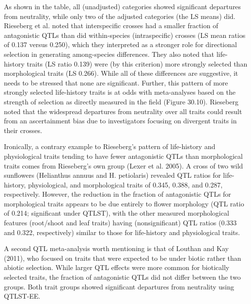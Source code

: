 \documentclass{article}
\begin{document}
As shown in the table, all (unadjusted) categories showed significant departures from neutrality, while only two of the adjusted categories (the LS means) did. Rieseberg et al. noted that interspecific crosses had a smaller fraction of antagonistic QTLs than did within-species (intraspecific) crosses (LS mean ratios of 0.137 versus 0.250), which they interpreted as a stronger role for directional selection in generating among-species differences. They also noted that life-history traits (LS ratio 0.139) were (by this criterion) more strongly selected than morphological traits (LS 0.266). While all of these differences are suggestive, it needs to be stressed that none are significant. Further, this pattern of more strongly selected life-history traits is at odds with meta-analyses based on the strength of selection as directly measured in the field (Figure 30.10). Rieseberg noted that the widespread departures from neutrality over all traits could result from an ascertainment bias due to investigators focusing on divergent traits in their crosses.

Ironically, a contrary example to Rieseberg's pattern of life-history and physiological traits tending to have fewer antagonistic QTLs than morphological traits comes from Rieseberg's own group (Lexer et al. 2005). A cross of two wild sunflowers (Helianthus annuus and H. petiolaris) revealed QTL ratios for life-history, physiological, and morphological traits of 0.345, 0.388, and 0.287, respectively. However, the reduction in the fraction of antagonistic QTLs for morphological traits appears to be due entirely to flower morphology (QTL ratio of 0.214; significant under QTLST), with the other measured morphological features (root/shoot and leaf traits) having (nonsignificant) QTL ratios (0.333 and 0.322, respectively) similar to those for life-history and physiological traits.

A second QTL meta-analysis worth mentioning is that of Louthan and Kay (2011), who focused on traits that were expected to be under biotic rather than abiotic selection. While larger QTL effects were more common for biotically selected traits, the fraction of antagonistic QTLs did not differ between the two groups. Both trait groups showed significant departures from neutrality using QTLST-EE.
\end{document}
